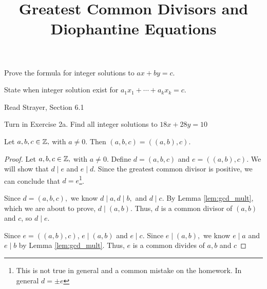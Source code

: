 \documentclass{ximera}
\title{Greatest Common Divisors and Diophantine Equations}
\begin{document}
\begin{abstract}
\end{abstract}
\maketitle


\begin{obj}
	\item Prove the formula for integer solutions to $ax+by=c$.
	\item State when integer solution exist for $a_1x_1+\cdots+a_kx_k=c$.
\end{obj}


\begin{instructorNotes}
	\begin{pre}
		\item[Read] Strayer, Section 6.1
		\item[Turn in] Exercise 2a.
		Find all integer solutions to $18x+28y=10$
	   \end{pre}
\end{instructorNotes}


\begin{lemma}\label{lem:gcd_3case}
	Let $a,b,c\in\mathbb Z,$ with $a\neq 0$. Then $(a,b,c)=((a,b),c).$

 	\begin{proof}
 		Let $a,b,c\in\mathbb Z,$ with $a\neq 0$. Define $d=(a,b,c)$ and $e=((a,b),c).$ We will show that $d\mid e$ and $e\mid d$. Since the greatest common divisor is positive, we can conclude that $d=e$\footnote{This is not true in general and a common mistake on the homework. In general $d=\pm e$}.

 		Since $d=(a,b,c),$ we know $d\mid a, d\mid b,$ and $d\mid c$. By Lemma \ref{lem:gcd_mult}, which we are about to prove, $d\mid (a,b)$. Thus, $d$ is a common divisor of $(a,b)$ and $c$, so $d\mid e$.

 		Since $e=((a,b),c)$, $e\mid  (a,b)$ and $e\mid c$. Since $e\mid (a,b),$ we know $e\mid a$ and $e\mid b$ by Lemma \ref{lem:gcd_mult}. Thus, $e$ is a common divides of $a,b$ and $c$
 	\end{proof}
\end{lemma}
\end{document}
